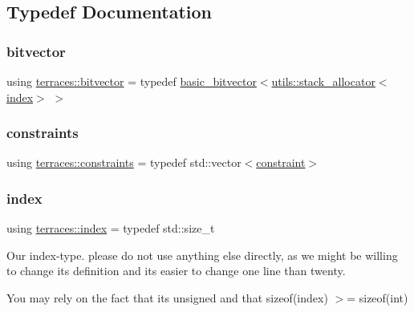 \subsection{Typedef Documentation}
\mbox{\label{namespaceterraces_a1b526fb554dff829f7ad51eb21d5ed06}} 
\subsubsection{\texorpdfstring{bitvector}{bitvector}}
{\footnotesize\ttfamily using \hyperlink{namespaceterraces_a1b526fb554dff829f7ad51eb21d5ed06}{terraces\+::bitvector} = typedef \hyperlink{classterraces_1_1basic__bitvector}{basic\+\_\+bitvector}$<$\hyperlink{classterraces_1_1utils_1_1stack__allocator}{utils\+::stack\+\_\+allocator}$<$\hyperlink{namespaceterraces_adbc33ccb543d1634e96d0eb02e472c77}{index}$>$ $>$}

\mbox{\label{namespaceterraces_a6f603ffd30ed4d902fce6424492e0581}} 
\subsubsection{\texorpdfstring{constraints}{constraints}}
{\footnotesize\ttfamily using \hyperlink{namespaceterraces_a6f603ffd30ed4d902fce6424492e0581}{terraces\+::constraints} = typedef std\+::vector$<$\hyperlink{structterraces_1_1constraint}{constraint}$>$}

\mbox{\label{namespaceterraces_adbc33ccb543d1634e96d0eb02e472c77}} 
\subsubsection{\texorpdfstring{index}{index}}
{\footnotesize\ttfamily using \hyperlink{namespaceterraces_adbc33ccb543d1634e96d0eb02e472c77}{terraces\+::index} = typedef std\+::size\+\_\+t}

Our index-\/type. please do not use anything else directly, as we might be willing to change it\textquotesingle{}s definition and it\textquotesingle{}s easier to change one line than twenty.

You may rely on the fact that it\textquotesingle{}s unsigned and that sizeof(index) $>$= sizeof(int) \mbox{\label{namespaceterraces_a148f3e895119c2a72d995caae669e40d}} 
